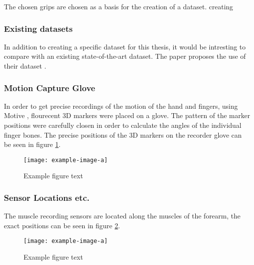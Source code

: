 \documentclass[../main.tex]{subfiles}
\begin{document}
The chosen grips are chosen as a basis for the creation of a dataset. creating 


\subsubsection{Existing datasets}

In addition to creating a specific dataset for this thesis, it would be intresting to compare with an existing state-of-the-art dataset.
The paper \cite{jarque2019} proposes the use of their dataset \cite{kinmusdataset}.



\subsubsection{Motion Capture Glove}

In order to get precise recordings of the motion of the hand and fingers, using Motive \cite{motive}, flourecent 3D markers were placed on a glove.
The pattern of the marker positions were carefully closen in order to calculate the angles of the individual finger bones.
The precise positions of the 3D markers on the recorder glove can be seen in figure \ref{fig:glove}.

\begin{figure}[h]
\begin{center}
\texttt{[image: example-image-a]}
\caption{Example figure text}
\label{fig:glove}
\end{center}
\end{figure}

\subsubsection{Sensor Locations etc.}

The muscle recording sensors are located along the muscles of the forearm, the exact positions can be seen in figure \ref{fig:musclesensors}.

\begin{figure}[h]
\begin{center}
\texttt{[image: example-image-a]}
\caption{Example figure text}
\label{fig:musclesensors}
\end{center}
\end{figure}
\end{document}

